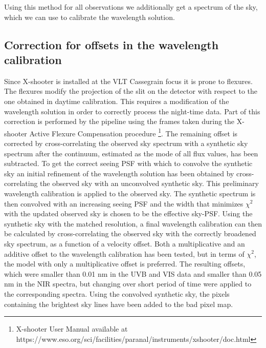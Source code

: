 \documentclass{aa}    %
\begin{document}
Using this method for all observations we additionally get a spectrum of the
sky, which we can use to calibrate the wavelength solution.


\subsection{Correction for offsets in the wavelength calibration}    \label{wavecal}

Since X-shooter is installed at the VLT Cassegrain focus it is prone to
flexures. The flexures modify the projection of the slit on the detector with
respect to the one obtained in daytime calibration. This requires a modification
of the wavelength solution in order to correctly process the night-time data.
Part of this correction is performed by the pipeline using the frames taken
during the X-shooter Active Flexure Compensation procedure \footnote{X-shooter
	User Manual available at
	https://www.eso.org/sci/facilities/paranal/instruments/xshooter/doc.html}. The
remaining offset is corrected by cross-correlating the observed sky spectrum
with a synthetic sky spectrum \citep{Noll2012, Jones2013} after the continuum,
estimated as the mode of all flux values, has been subtracted. To get the
correct seeing PSF with which to convolve the synthetic sky an initial
refinement of the wavelength solution has been obtained by cross-correlating
the observed sky with an unconvolved synthetic sky. This preliminary wavelength
calibration is applied to the observed sky. The synthetic spectrum is then
convolved with an increasing seeing PSF and the width that minimizes $\chi^2$
with the updated observed sky is chosen to be the effective sky-PSF. Using the
synthetic sky with the matched resolution, a final wavelength calibration can
then be calculated by cross-correlating the observed sky with the correctly
broadened sky spectrum, as a function of a velocity offset. Both a
multiplicative and an additive offset to the wavelength calibration has been
tested, but in terms of $\chi^2$, the model with only a multiplicative offset is
preferred. The resulting offsets, which were smaller than 0.01 nm in the UVB and
VIS data and smaller than 0.05 nm in the NIR spectra, but changing over short
period of time were applied to the corresponding spectra. Using the convolved
synthetic sky, the pixels containing the brightest sky lines have been added to
the bad pixel map.
\end{document}
